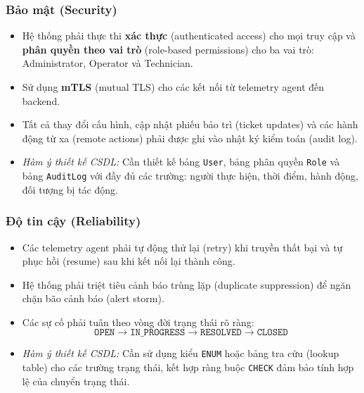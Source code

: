 \subsubsection{Bảo mật (Security)}
\begin{itemize}[leftmargin=2em]
    \item Hệ thống phải thực thi \textbf{xác thực} (authenticated access) cho mọi truy cập và \textbf{phân quyền theo vai trò} (role-based permissions) cho ba vai trò: Administrator, Operator và Technician.
    \item Sử dụng \textbf{mTLS} (mutual TLS) cho các kết nối từ telemetry agent đến backend.
    \item Tất cả thay đổi cấu hình, cập nhật phiếu bảo trì (ticket updates) và các hành động từ xa (remote actions) phải được ghi vào nhật ký kiểm toán (audit log).
    \item \textit{Hàm ý thiết kế CSDL:} Cần thiết kế bảng \texttt{User}, bảng phân quyền \texttt{Role} và bảng \texttt{AuditLog} với đầy đủ các trường: người thực hiện, thời điểm, hành động, đối tượng bị tác động.
\end{itemize}

\subsubsection{Độ tin cậy (Reliability)}
\begin{itemize}[leftmargin=2em]
    \item Các telemetry agent phải tự động thử lại (retry) khi truyền thất bại và tự phục hồi (resume) sau khi kết nối lại thành công.
    \item Hệ thống phải triệt tiêu cảnh báo trùng lặp (duplicate suppression) để ngăn chặn bão cảnh báo (alert storm).
    \item Các sự cố phải tuân theo vòng đời trạng thái rõ ràng:
    \begin{equation*}
    \texttt{OPEN} \longrightarrow \texttt{IN\_PROGRESS} \longrightarrow \texttt{RESOLVED} \longrightarrow \texttt{CLOSED}
    \end{equation*}
    \item \textit{Hàm ý thiết kế CSDL:} Cần sử dụng kiểu \texttt{ENUM} hoặc bảng tra cứu (lookup table) cho các trường trạng thái, kết hợp ràng buộc \texttt{CHECK} đảm bảo tính hợp lệ của chuyển trạng thái.
\end{itemize}

